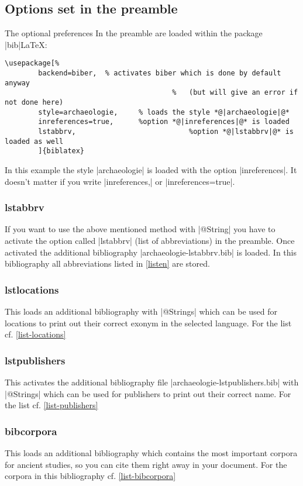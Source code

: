 \documentclass[a4paper,
10pt,
greek,
french,
spanish,
italian,
ngerman,
english
]{ltxdoc}
\begin{document}
 \subsection{Options set in the preamble}\label{options-preamble}
The optional preferences   In the preamble are loaded within the package  |bib|\LaTeX:
 \begin{lstlisting}
\usepackage[%				
		backend=biber,	% activates biber which is done by default anyway 
										%	(but will give an error if not done here)
		style=archaeologie, 	% loads the style *@|archaeologie|@*
		inreferences=true,		%option *@|inreferences|@* is loaded
		lstabbrv,							%option *@|lstabbrv|@* is loaded as well
		]{biblatex}
\end{lstlisting}
In this example the style |archaeologie| is loaded with the option |inreferences|.
It doesn't matter if you write |inreferences,| or |inreferences=true|.


\subsubsection{lstabbrv}\label{abbrv}
 If you want to use the above mentioned method with |@String| you have to activate the option called  |lstabbrv| (list of abbreviations) in the preamble.
Once activated the additional bibliography  |archaeologie-lstabbrv.bib| is loaded. 
In this bibliography all abbreviations listed in \cref{listen} are stored.

\subsubsection{lstlocations}\label{lstlocations}
This loads an additional bibliography with |@Strings| which can be used for locations to print out their correct exonym in the selected language.
For the list cf. \cref{list-locations}

\subsubsection{lstpublishers}\label{lstpublishers}
This activates the additional bibliography file  |archaeologie-lstpublishers.bib| with |@Strings| which can be used for publishers to print out their correct name.
For the list cf. \cref{list-publishers}

\subsubsection{bibcorpora}\label{bibcorpora}
This loads an additional bibliography which contains the most important corpora for ancient studies, so you can cite them right away in your document.
For the corpora in this bibliography cf. \cref{list-bibcorpora}
\end{document}
